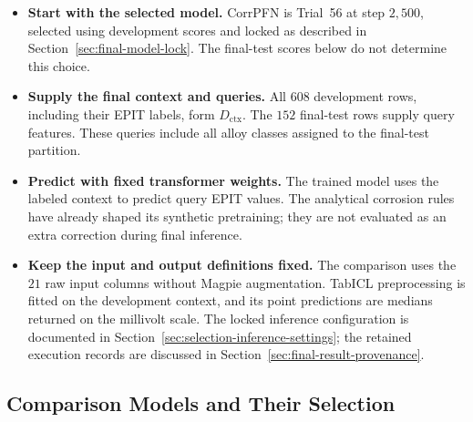 \documentclass[11pt]{article}
\newenvironment{notes}
  {\begin{itemize}\setlength{\itemsep}{0.45em}\setlength{\parsep}{0pt}}
  {\end{itemize}}
\begin{document}
\begin{notes}
    \item \textbf{Start with the selected model.}
    CorrPFN is Trial~56 at step \(2{,}500\), selected using
    development scores and locked as described in
    Section~\ref{sec:final-model-lock}.
    The final-test scores below do not determine this choice.

    \item \textbf{Supply the final context and queries.}
    All \(608\) development rows, including their EPIT
    labels, form \(D_{\mathrm{ctx}}\).
    The \(152\) final-test rows supply query features.
    These queries include all alloy classes assigned to the
    final-test partition.

    \item \textbf{Predict with fixed transformer weights.}
    The trained model uses the labeled context to predict
    query EPIT values. The analytical corrosion rules have
    already shaped its synthetic pretraining; they are not
    evaluated as an extra correction during final inference.

    \item \textbf{Keep the input and output definitions fixed.}
    The comparison uses the \(21\) raw input columns without
    Magpie augmentation. TabICL preprocessing is fitted on
    the development context, and its point predictions are
    medians returned on the millivolt scale.
    The locked inference configuration is documented in
    Section~\ref{sec:selection-inference-settings};
    the retained execution records are discussed in
    Section~\ref{sec:final-result-provenance}.
\end{notes}

\subsection{Comparison Models and Their Selection}
\label{sec:comparison-models}
\end{document}
